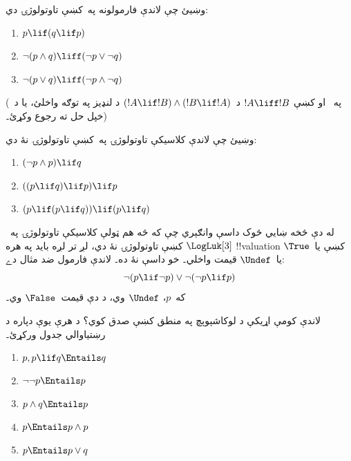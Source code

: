 \documentclass[../../../include/open-logic-section]{subfiles}
\begin{document}
\begin{prob}
  وښيئ چې لاندې فارمولونه په~\LogLuk[3] کښې تاوتولوژۍ دي:
  \begin{enumerate}
    \item $p \lif (q \lif p)$
    \item\label{mvl:thr:luk:prob:luk-taut-2} $\lnot(p \land q) \liff (\lnot p \lor \lnot q)$
    \item\label{mvl:thr:luk:prob:luk-taut-3} $\lnot(p \lor q) \liff (\lnot p \land \lnot q)$
  \end{enumerate}
  (په~ او
   کښې $!A \liff !B$
  د~$(!A \lif !B) \land (!B \lif !A)$ د لنډيز په توګه واخلئ،
  يا د~ خپل حل ته رجوع وکړئ۔)
\end{prob}

\begin{prob}
  وښيئ چې لاندې کلاسيکې تاوتولوژۍ په~\LogLuk[3] کښې
  تاوتولوژۍ نۀ دي:
  \begin{enumerate}
    \item $(\lnot p \land p) \lif q$
    \item $((p \lif q) \lif p) \lif p$
    \item $(p \lif (p \lif q)) \lif (p \lif q)$
  \end{enumerate}
\end{prob}

له دې څخه ښايي څوک داسې وانګېري چې که څه هم ټولې کلاسيکې
تاوتولوژۍ په~$\LogLuk[3]$ کښې تاوتولوژۍ نۀ دي، لږ تر لږه بايد
په هره !!{valuation} کښې يا~$\True$ يا~$\Undef$ قيمت واخلي۔
خو داسې نۀ ده۔ لاندې فارمول ضد مثال دے:
\[
  \lnot(p \lif \lnot p) \lor \lnot(\lnot p \lif p)
\]
که~$p$، $\Undef$ وي، د دې قيمت~$\False$ وي۔

\begin{prob}
  لاندې کومې اړيکې د لوکاشېوېچ په منطق کښې صدق کوي؟ د هرې
  يوې دپاره د رښتياوالي جدول ورکړئ۔
  \begin{enumerate}
    \item $p, p \lif q \Entails q$
    \item $\lnot\lnot p \Entails p$
    \item $p \land q \Entails p$
    \item $p \Entails p \land p$
    \item $p \Entails p \lor q$
  \end{enumerate}
\end{prob}
\end{document}
